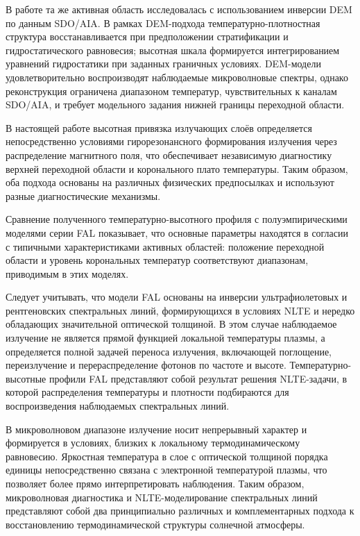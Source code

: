 \documentclass[
 aps, pra,
 amsmath,amssymb,
 11pt,
 final,
tightenlines,
 twoside,
 twocolumn,
 nofloats,
nofootinbib,
 superscriptaddress,
showkeys,
showkeywords,
 ]
{revtex4-2}
\begin{document}
В работе \citep{Alissandrakis2019} та же активная область исследовалась
с использованием инверсии DEM по данным
SDO/AIA. В рамках DEM-подхода температурно-плотностная структура
восстанавливается при предположении стратификации и гидростатического
равновесия; высотная шкала формируется интегрированием уравнений
гидростатики при заданных граничных условиях. DEM-модели удовлетворительно
воспроизводят наблюдаемые микроволновые спектры, однако реконструкция
ограничена диапазоном температур, чувствительных к каналам SDO/AIA, и требует
модельного задания нижней границы переходной области.

В настоящей работе высотная привязка излучающих слоёв определяется
непосредственно условиями гирорезонансного формирования излучения
через распределение магнитного поля, что обеспечивает независимую
диагностику верхней переходной области и коронального плато температуры.
Таким образом, оба подхода основаны на различных физических предпосылках
и используют разные диагностические механизмы.

Сравнение полученного температурно-высотного профиля
с полуэмпирическими моделями серии FAL \citep{Fontenla2009}
показывает, что основные параметры находятся в согласии
с типичными характеристиками активных областей:
положение переходной области и уровень корональных температур
соответствуют диапазонам, приводимым в этих моделях.

Следует учитывать, что модели FAL основаны на инверсии
ультрафиолетовых и рентгеновских спектральных линий,
формирующихся в условиях NLTE и нередко обладающих
значительной оптической толщиной. В этом случае
наблюдаемое излучение не является прямой функцией
локальной температуры плазмы, а определяется полной
задачей переноса излучения, включающей поглощение,
переизлучение и перераспределение фотонов по частоте
и высоте. Температурно-высотные профили FAL представляют
собой результат решения NLTE-задачи, в которой
распределения температуры и плотности подбираются
для воспроизведения наблюдаемых спектральных линий.

В микроволновом диапазоне излучение носит 
непрерывный характер и формируется в условиях,
близких к локальному термодинамическому равновесию.
Яркостная температура в слое с оптической толщиной
порядка единицы непосредственно связана с электронной
температурой плазмы, что позволяет более прямо
интерпретировать наблюдения. Таким образом,
микроволновая диагностика и NLTE-моделирование
спектральных линий представляют собой два принципиально
различных и комплементарных подхода к восстановлению
термодинамической структуры солнечной атмосферы.
\end{document}
